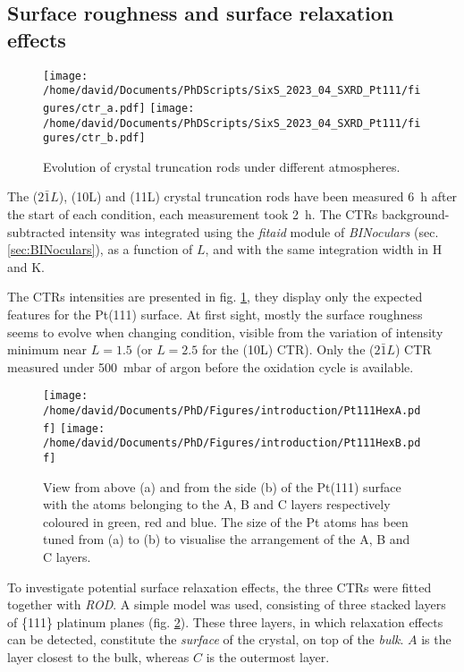 \subsection{Surface roughness and surface relaxation effects}

\begin{figure}[!htb]
    \centering
    \texttt{[image: /home/david/Documents/PhDScripts/SixS\_2023\_04\_SXRD\_Pt111/figures/ctr\_a.pdf]}
    \texttt{[image: /home/david/Documents/PhDScripts/SixS\_2023\_04\_SXRD\_Pt111/figures/ctr\_b.pdf]}
    \caption{
        Evolution of crystal truncation rods under different atmospheres.
    }
    \label{fig:CTRPt111}
\end{figure}

The ($2\bar{1}L$), (10L) and (11L) crystal truncation rods have been measured \qty{6}{\hour} after the start of each condition, each measurement took \qty{2}{\hour}.
The CTRs background-subtracted intensity was integrated using the \textit{fitaid} module of \textit{BINoculars} (sec. \ref{sec:BINoculars}), as a function of $L$, and with the same integration width in H and K.

The CTRs intensities are presented in fig. \ref{fig:CTRPt111}, they display only the expected features for the Pt(111) surface.
At first sight, mostly the surface roughness seems to evolve when changing condition, visible from the variation of intensity minimum near $L=1.5$ (or $L=2.5$ for the (10L) CTR).
Only the ($2\bar{1}L$) CTR measured under \qty{500}{\milli\bar} of argon before the oxidation cycle is available.

\begin{figure}[!htb]
    \centering
    \texttt{[image: /home/david/Documents/PhD/Figures/introduction/Pt111HexA.pdf]}
    \texttt{[image: /home/david/Documents/PhD/Figures/introduction/Pt111HexB.pdf]}
    \caption{
        View from above (a) and from the side (b) of the Pt(111) surface with the atoms belonging to the A, B and C layers respectively coloured in green, red and blue.
        The size of the Pt atoms has been tuned from (a) to (b) to visualise the arrangement of the A, B and C layers.
    }
    \label{fig:Pt111StructureSideAndTop}
\end{figure}

To investigate potential surface relaxation effects, the three CTRs were fitted together with \textit{ROD}.
A simple model was used, consisting of three stacked layers of \{111\} platinum planes (fig. \ref{fig:Pt111StructureSideAndTop}).
These three layers, in which relaxation effects can be detected, constitute the \textit{surface} of the crystal, on top of the \textit{bulk}.
$A$ is the layer closest to the bulk, whereas $C$ is the outermost layer.

